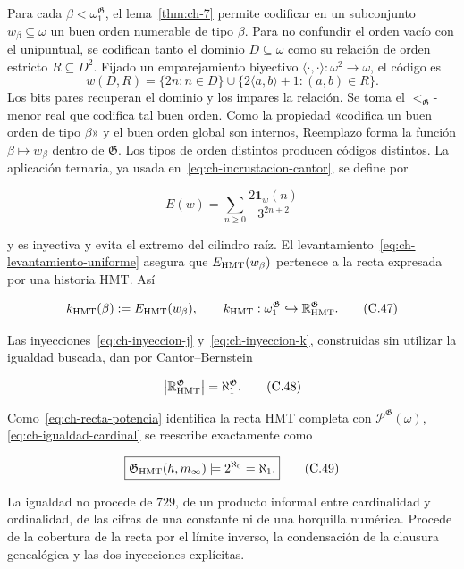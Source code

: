 Para cada \(\beta<\omega_1^{\mathfrak G}\), el lema~\ref{thm:ch-7} permite codificar en un
subconjunto \(w_\beta\subseteq\omega\) un buen orden numerable de tipo
\(\beta\). Para no confundir el orden vacío con el unipuntual, se codifican
tanto el dominio \(D\subseteq\omega\) como su relación de orden estricto
\(R\subseteq D^2\). Fijado un emparejamiento biyectivo
\(\langle\cdot,\cdot\rangle:\omega^2\to\omega\), el código es
\[
 w(D,R)=\{2n:n\in D\}\cup
        \{2\langle a,b\rangle+1:(a,b)\in R\}.
\]
Los bits pares recuperan el dominio y los impares la relación. Se toma el
\(<_{\mathfrak G}\)-menor real que codifica tal buen orden. Como la propiedad
«codifica un buen orden de tipo \(\beta\)» y el buen orden global son internos,
Reemplazo forma la función \(\beta\mapsto w_\beta\) dentro de
\(\mathfrak G\). Los tipos de orden distintos producen códigos distintos. La
aplicación ternaria, ya usada en~\eqref{eq:ch-incrustacion-cantor}, se define por

\[
 E(w)=\sum_{n\ge0}\frac{2\mathbf1_w(n)}{3^{2n+2}}
\tag{C.46}\label{eq:ch-incrustacion-ternaria}
\]

y es inyectiva y evita el extremo del cilindro raíz. El levantamiento~\eqref{eq:ch-levantamiento-uniforme}
asegura que \(E_{\rm HMT}(w_\beta)\) pertenece a la recta expresada por una
historia HMT. Así

\[
 k_{\rm HMT}(\beta):=E_{\rm HMT}(w_\beta),
 \qquad
 k_{\rm HMT}:\omega_1^{\mathfrak G}
 \hookrightarrow\mathbb R_{\rm HMT}^{\mathfrak G}.
\tag{C.47}\label{eq:ch-inyeccion-k}
\]

Las inyecciones~\eqref{eq:ch-inyeccion-j} y~\eqref{eq:ch-inyeccion-k}, construidas sin utilizar la igualdad buscada,
dan por Cantor--Bernstein

\[
 \bigl|\mathbb R_{\rm HMT}^{\mathfrak G}\bigr|
 =\aleph_1^{\mathfrak G}.
\tag{C.48}\label{eq:ch-igualdad-cardinal}
\]

Como~\eqref{eq:ch-recta-potencia} identifica la recta HMT completa con
\(\mathcal P^{\mathfrak G}(\omega)\), \eqref{eq:ch-igualdad-cardinal} se reescribe exactamente como

\[
 \boxed{
  \mathfrak G_{\rm HMT}(h,m_\infty)
  \models 2^{\aleph_0}=\aleph_1.}
\tag{C.49}\label{eq:ch-decision}
\]

La igualdad no procede de \(729\), de un producto informal entre cardinalidad
y ordinalidad, de las cifras de una constante ni de una horquilla numérica.
Procede de la cobertura de la recta por el límite inverso, la condensación de
la clausura genealógica y las dos inyecciones explícitas.

